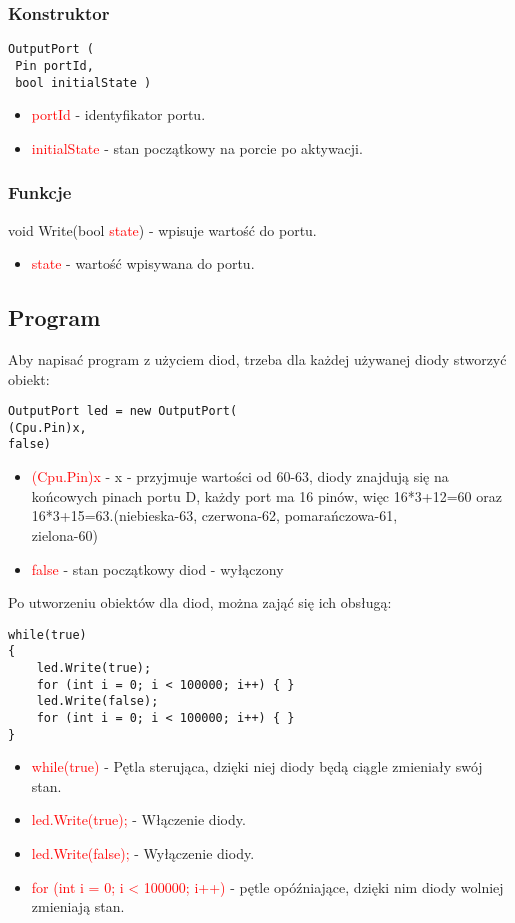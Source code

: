 \documentclass{article}
\begin{document}
\subsubsection{Konstruktor}
\begin{lstlisting}[frame=single] 
 OutputPort (
 Pin portId,
 bool initialState )
\end{lstlisting}
\begin{itemize}
\item \textcolor{red}{portId} - identyfikator portu.
\item \textcolor{red}{initialState} - stan początkowy na porcie po aktywacji.
\end{itemize}
\subsubsection{Funkcje}
void Write(bool \textcolor{red}{state}) - wpisuje wartość do portu.
\begin{itemize}
\item \textcolor{red}{state} - wartość wpisywana do portu.
\end{itemize}
\subsection{Program}
Aby napisać program z użyciem diod, trzeba dla każdej używanej diody stworzyć obiekt:
\begin{lstlisting}[frame=single] 
OutputPort led = new OutputPort(
(Cpu.Pin)x,
false)
\end{lstlisting}
\begin{itemize}
\item \textcolor{red}{(Cpu.Pin)x} - x - przyjmuje wartości od 60-63, diody znajdują się na \newline końcowych pinach portu D, każdy port ma 16 pinów, więc 16*3+12=60 oraz 16*3+15=63.(niebieska-63, czerwona-62, pomarańczowa-61, \\zielona-60)
\item \textcolor{red}{false} - stan początkowy diod - wyłączony
\end{itemize}
Po utworzeniu obiektów dla diod, można zająć się ich obsługą:
\begin{lstlisting}[frame=single] 
while(true)
{
	led.Write(true);
	for (int i = 0; i < 100000; i++) { }
	led.Write(false);
	for (int i = 0; i < 100000; i++) { }
}
\end{lstlisting}
\begin{itemize}
\item \textcolor{red}{while(true)} - Pętla sterująca, dzięki niej diody będą ciągle zmieniały swój stan.
\item \textcolor{red}{led.Write(true);} - Włączenie diody.
\item \textcolor{red}{led.Write(false);} - Wyłączenie diody.
\item \textcolor{red}{for (int i = 0; i < 100000; i++) { }} - pętle opóźniające, dzięki nim diody wolniej zmieniają stan.
\end{itemize}
\end{document}
